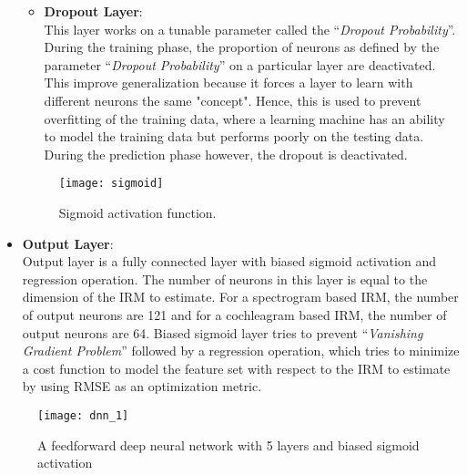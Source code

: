 \begin{itemize}
\begin{itemize}
\item \textbf{Dropout Layer}:\\
This layer works on a tunable parameter called the \enquote{\textit{Dropout Probability}}. During the training phase, the proportion of neurons as defined by the parameter \enquote{\textit{Dropout Probability}} on a particular layer are deactivated. This improve generalization because it forces a layer to learn with different neurons the same "concept". Hence, this is used to prevent overfitting of the training data, where a learning machine has an ability to model the training data but performs poorly on the testing data. During the prediction phase however, the dropout is deactivated.
\end{itemize}
\begin{figure}[!htbp]
\centering
\texttt{[image: sigmoid]}
\caption{Sigmoid activation function.}
\label{fig:sigmoid}
\end{figure}
\item \textbf{Output Layer}:\\
Output layer is a fully connected layer with biased sigmoid activation and  regression operation. The number of neurons in this layer is equal to the dimension of the IRM to estimate. For a spectrogram based IRM, the number of output neurons are 121 and for a cochleagram based IRM, the number of output neurons are 64. Biased sigmoid layer tries to prevent \enquote{\textit{Vanishing Gradient Problem}} followed by a regression operation, which tries to minimize a cost function to model the feature set with respect to the IRM to estimate by using RMSE as an optimization metric.
\end{itemize}
\begin{figure}[!htbp]
\centering
\texttt{[image: dnn\_1]}
\caption{A feedforward deep neural network with 5 layers and biased sigmoid activation}
\label{fig:dnn_1}
\end{figure}

